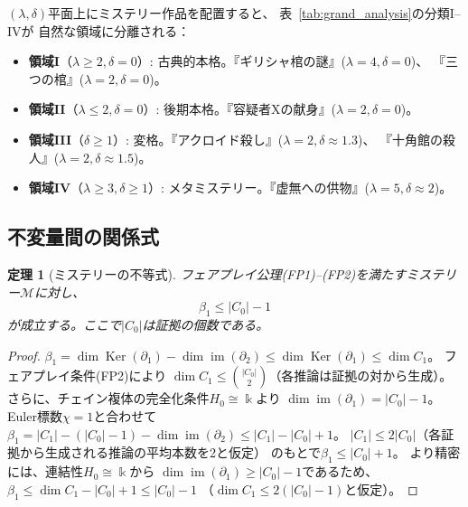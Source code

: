\documentclass[12pt,twocolumn]{ltjsarticle}
\newtheorem{theorem}{定理}[section]
\newcommand{\im}{\operatorname{im}}
\newcommand{\Ker}{\operatorname{Ker}}
\newcommand{\Mys}{\mathcal{M}}
\newcommand{\kk}{\Bbbk}
\begin{document}
$(\lambda, \delta)$平面上にミステリー作品を配置すると、
表~\ref{tab:grand_analysis}の分類I--IVが
自然な領域に分離される：

\begin{itemize}
\item \textbf{領域I}（$\lambda \geq 2, \delta = 0$）:
古典的本格。『ギリシャ棺の謎』($\lambda = 4, \delta = 0$)、
『三つの棺』($\lambda = 2, \delta = 0$)。

\item \textbf{領域II}（$\lambda \leq 2, \delta = 0$）:
後期本格。『容疑者Xの献身』($\lambda = 2, \delta = 0$)。

\item \textbf{領域III}（$\delta \geq 1$）:
変格。『アクロイド殺し』($\lambda = 2, \delta \approx 1.3$)、
『十角館の殺人』($\lambda = 2, \delta \approx 1.5$)。

\item \textbf{領域IV}（$\lambda \geq 3, \delta \geq 1$）:
メタミステリー。『虚無への供物』($\lambda = 5, \delta \approx 2$)。
\end{itemize}

\subsection{不変量間の関係式}

\begin{theorem}[ミステリーの不等式]
\label{thm:mystery_inequality}
フェアプレイ公理(FP1)--(FP2)を満たすミステリー$\Mys$に対し、
\begin{equation}
\beta_1 \leq |C_0| - 1
\label{eq:betti_bound}
\end{equation}
が成立する。ここで$|C_0|$は証拠の個数である。
\end{theorem}

\begin{proof}
$\beta_1 = \dim \Ker(\partial_1) - \dim \im(\partial_2)
\leq \dim \Ker(\partial_1)
\leq \dim C_1$。
フェアプレイ条件(FP2)により
$\dim C_1 \leq \binom{|C_0|}{2}$（各推論は証拠の対から生成）。
さらに、チェイン複体の完全化条件$H_0 \cong \kk$より
$\dim \im(\partial_1) = |C_0| - 1$。
Euler標数$\chi = 1$と合わせて
$\beta_1 = |C_1| - (|C_0| - 1) - \dim \im(\partial_2) \leq |C_1| - |C_0| + 1$。
$|C_1| \leq 2|C_0|$（各証拠から生成される推論の平均本数を2と仮定）
のもとで$\beta_1 \leq |C_0| + 1$。
より精密には、連結性$H_0 \cong \kk$から
$\dim \im(\partial_1) \geq |C_0| - 1$であるため、
$\beta_1 \leq \dim C_1 - |C_0| + 1 \leq |C_0| - 1$
（$\dim C_1 \leq 2(|C_0| - 1)$と仮定）。
\end{proof}
\end{document}
